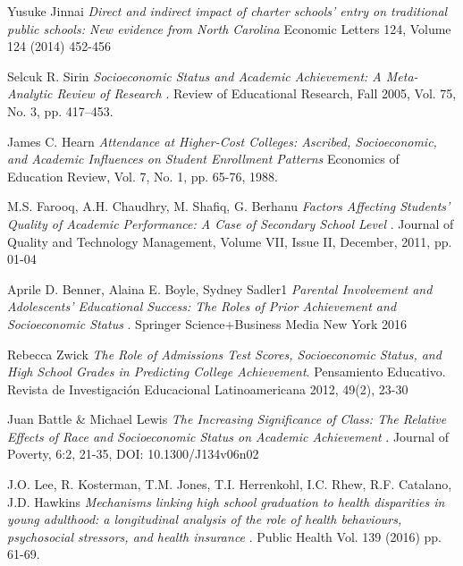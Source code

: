\documentclass[sigconf,nonacm,11pt]{acmart}
\begin{document}

\begin{thebibliography}{9}
Yusuke Jinnai
\textit{Direct and indirect impact of charter schools’ entry on traditional public schools: New evidence from North Carolina}
Economic Letters 124, Volume 124 (2014) 452-456

Selcuk R. Sirin
\textit{Socioeconomic Status and Academic Achievement: A Meta-Analytic Review of Research }. 
Review of Educational Research, Fall 2005, Vol. 75, No. 3, pp. 417–453.

James C. Hearn
\textit{Attendance at Higher-Cost Colleges: Ascribed, Socioeconomic, and Academic Influences on Student Enrollment Patterns}
Economics of Education Review, Vol. 7, No.  1, pp. 65-76, 1988.

M.S. Farooq, A.H. Chaudhry, M. Shafiq, G. Berhanu
\textit{Factors Affecting Students' Quality of Academic Performance: A Case of Secondary School Level }.
Journal of Quality and Technology Management, Volume VII, Issue II, December, 2011, pp. 01-04

Aprile D. Benner, Alaina E. Boyle, Sydney Sadler1
\textit{ Parental Involvement and Adolescents’ Educational Success: The Roles of Prior Achievement and Socioeconomic Status }. 
Springer Science+Business Media New York 2016

Rebecca Zwick 
\textit{The Role of Admissions Test Scores, Socioeconomic Status, and High School Grades in Predicting College Achievement}. 
Pensamiento Educativo. Revista de Investigación Educacional Latinoamericana 2012, 49(2), 23-30

Juan Battle \& Michael Lewis
\textit{ The Increasing Significance of Class: The Relative Effects of Race and Socioeconomic Status on Academic Achievement }. 
Journal of Poverty, 6:2, 21-35, DOI: 10.1300/J134v06n02

J.O. Lee, R. Kosterman, T.M. Jones, T.I. Herrenkohl, I.C. Rhew, R.F. Catalano, J.D. Hawkins
\textit{ Mechanisms linking high school graduation to health disparities in young adulthood: a longitudinal analysis of the role of health behaviours, psychosocial stressors, and health insurance }. 
Public Health Vol. 139 (2016) pp. 61-69.


\end{thebibliography}
\end{document}
